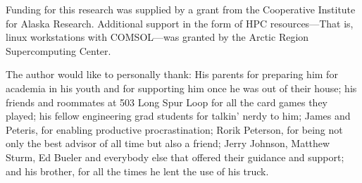 
Funding for this research was supplied by a grant from the Cooperative Institute
for Alaska Research. Additional support in the form of HPC resources---That is, 
linux workstations with COMSOL---was granted by the Arctic Region Supercomputing
Center.

The author would like to personally thank: His parents for preparing him for academia in his youth and
for supporting him once he was out of their house;
his friends and roommates at 503 Long Spur Loop for all the card games they played;
his fellow engineering grad students for talkin' nerdy to him;
James and Peteris, for enabling productive procrastination;
Rorik Peterson, for being not only the best advisor of all time but also a friend;
Jerry Johnson, Matthew Sturm, Ed Bueler and everybody else that offered their guidance and support; 
and his brother, for all the times he lent the use of his truck.
